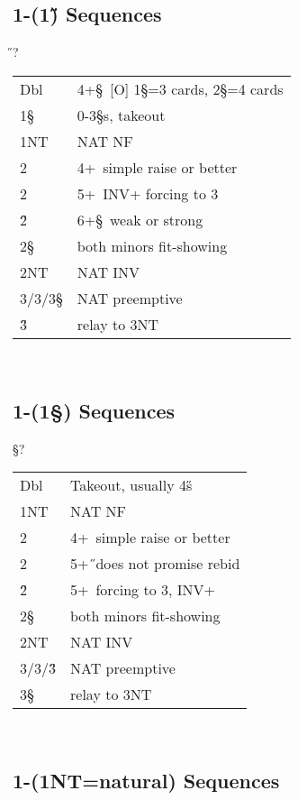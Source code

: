 \subsection{1\D-(1\H) Sequences}

\begin{bidding}
\>\D{}\H\>?
\end{bidding}

\begin{xtabular}{ll}
Dbl & 4+\S \ [O] 1\S=3 cards, 2\S=4 cards \\
1\S & 0-3\S s, takeout \\
1NT & NAT NF \\
2\C & 4+\D\ simple raise or better \\
2\D & 5+\C\  INV+ forcing to 3\C \\
2\H & 6+\S\ weak or strong \\
2\S & both minors fit-showing \\
2NT & NAT INV \\
3\C/3\D/3\S & NAT preemptive \\ 
3\H & relay to 3NT \\ 
\end{xtabular}\\

\subsection{1\D-(1\S) Sequences}

\begin{bidding}
\>\D{}\S\>?
\end{bidding}

\begin{xtabular}{ll}
Dbl & Takeout, usually 4\H s \\
1NT & NAT NF \\
2\C & 4+\D\ simple raise or better \\
2\D & 5+\H\ does not promise rebid \\
2\H & 5+\C\ forcing to 3\C, INV+ \\
2\S & both minors fit-showing \\
2NT & NAT INV \\
3\C/3\D/3\H & NAT preemptive \\ 
3\S & relay to 3NT \\ 
\end{xtabular}\\

\subsection{1\D-(1NT=natural) Sequences}

